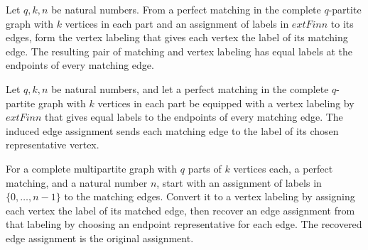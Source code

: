 \begin{definition}
\label{FABL.graphMatchingEdgeAssignmentToLabeling}
\leanok
{}
Let $q,k,n$ be natural numbers. From a perfect matching in the complete $q$-partite
graph with $k$ vertices in each part and an assignment of labels in $	ext{Fin }n$ to its
edges, form the vertex labeling that gives each vertex the label of its matching edge.
The resulting pair of matching and vertex labeling has equal labels at the endpoints of
every matching edge.
\end{definition}

\begin{definition}
\label{FABL.graphMatchingLabelingToEdgeAssignment}
\leanok
{}
Let $q,k,n$ be natural numbers, and let a perfect matching in the complete $q$-partite
graph with $k$ vertices in each part be equipped with a vertex labeling by $	ext{Fin }n$
that gives equal labels to the endpoints of every matching edge. The induced edge
assignment sends each matching edge to the label of its chosen representative vertex.
\end{definition}

\begin{theorem}
\label{FABL.graphMatchingEdgeAssignmentToLabeling_leftInverse}
\leanok
{}
For a complete multipartite graph with $q$ parts of $k$ vertices each, a perfect
matching, and a natural number $n$, start with an assignment of labels in
$\{0,\ldots,n-1\}$ to the matching edges. Convert it to a vertex labeling by assigning
each vertex the label of its matched edge, then recover an edge assignment from that
labeling by choosing an endpoint representative for each edge. The recovered edge
assignment is the original assignment.
\end{theorem}

